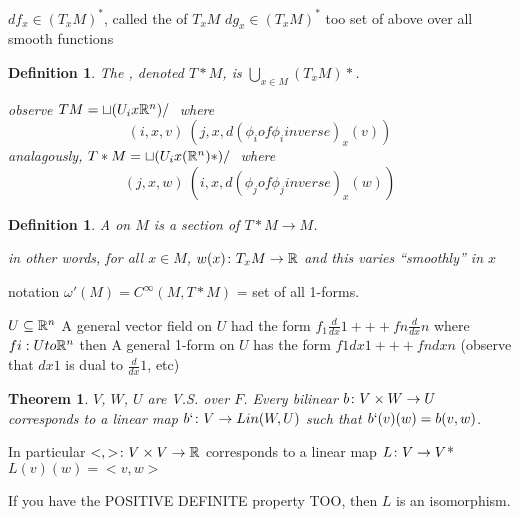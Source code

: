\documentclass[11pt]{amsbook}
\newenvironment{dateenv}{
	\vspace{1em}
}{
	\vspace{1em}
}
\newcommand{\mydate}[4]{
	\newdate{#1}{#2}{#3}{#4}
	\begin{dateenv}
		\hfill\displaydate{#1}
	\end{dateenv}
}
\theoremstyle{mystyle} %
\newtheorem{thrm}[thm]{Theorem}
\newtheorem{defi}[thm]{Definition}
\numberwithin{thm}{section}
\newcommand{\x}{\times}
\begin{document}
$df_x \in (T_xM)^*$, called the  of $T_xM$
$dg_x \in (T_xM)^*$ too
set of above over all smooth functions

\begin{defi}
	The , denoted $T*M$, is
	$\bigcup_{x \in M} (T_xM)*$.


	observe
	$TM = \sqcup (U_i x {\mathbb R}^n)/~$
	where $$(i, x, v) ~ (j, x, d(\phi_i of \phi_i inverse)_x(v))$$
	analagously,
	$T*M = \sqcup (U_i x ({\mathbb R}^n)*)/~$
	where $$(j, x, w) ~ (i, x, d(\phi_j of \phi_j inverse)_x(w))$$
\end{defi}
\begin{defi}
	A  on $M$ is a section of $T*M \to M$.

	in other words, for all $x \in M$, $w(x)\colon T_xM \to {\mathbb R}$ and this varies ``smoothly'' in $x$
\end{defi}
	notation
	$\omega'(M) = C^\infty(M, T*M)$ = set of all 1-forms.

\begin{example}
	$U \subseteq {\mathbb R}^n$
	A general vector field on $U$ had the form
	$f_1 \frac{d}{dx}1 +++ fn \frac{d}{dx}n$
	where $fi : U to {\mathbb R}^n$
	then
	A general 1-form on $U$ has the form
	$f1 dx1 +++ fn dxn$
	(observe that $dx1$ is dual to $\frac{d}{dx}1$, etc)
\end{example}

\mydate{d7}{17}{10}{2016}

\begin{thrm}
	$V$, $W$, $U$ are V.S. over $F$.  Every bilinear $b\from V \x W \to U$ corresponds to a linear map $b` \colon V \to Lin(W,U)$
	such that $b`(v)(w) = b(v,w)$.
\end{thrm}
	In particular $<,> \from V \x V \to \R$
	corresponds to a linear map
	$L\colon V \to V$*
	$L(v)(w) = <v,w>$

	If you have the POSITIVE DEFINITE property TOO, then $L$ is an isomorphism.
\end{document}
